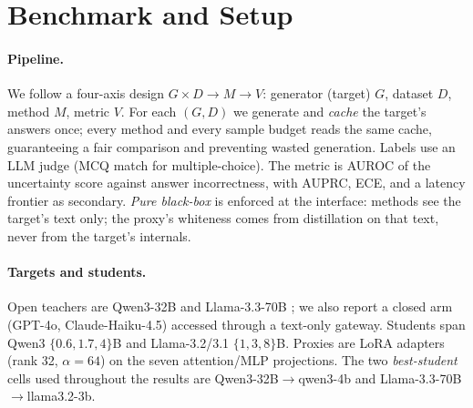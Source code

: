 \documentclass[11pt]{article}
\begin{document}
\section{Benchmark and Setup}\label{sec:setup}
\paragraph{Pipeline.} We follow a four-axis design $G\times D\to M\to V$: generator
(target) $G$, dataset $D$, method $M$, metric $V$. For each $(G,D)$ we generate and
\emph{cache} the target's answers once; every method and every sample budget reads the
same cache, guaranteeing a fair comparison and preventing wasted generation. Labels use
an LLM judge (MCQ match for multiple-choice). The metric is AUROC of the uncertainty
score against answer incorrectness, with AUPRC, ECE, and a latency frontier as
secondary. \emph{Pure black-box} is enforced at the interface: methods see the target's
text only; the proxy's whiteness comes from distillation on that text, never from the
target's internals.

\paragraph{Targets and students.} Open teachers are Qwen3-32B \citep{yang2024qwen3} and
Llama-3.3-70B \citep{dubey2024llama3}; we also report a closed arm (GPT-4o,
Claude-Haiku-4.5) accessed through a text-only gateway. Students span Qwen3
$\{0.6,1.7,4\}$B and Llama-3.2/3.1 $\{1,3,8\}$B. Proxies are LoRA adapters
\citep{hu2022lora} (rank 32, $\alpha{=}64$) on the seven attention/MLP projections. The
two \emph{best-student} cells used throughout the results are Qwen3-32B$\to$qwen3-4b and
Llama-3.3-70B$\to$llama3.2-3b.
\end{document}
